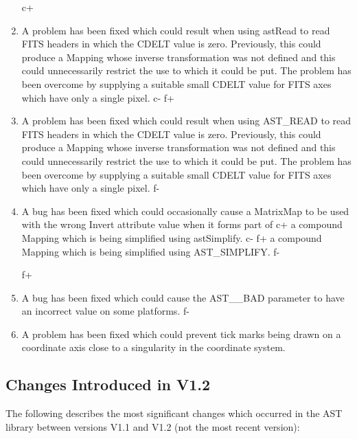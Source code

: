 \documentclass[twoside,11pt]{article}
\begin{document}
\begin{enumerate}
c+
\item A problem has been fixed which could result when using astRead
to read FITS headers in which the CDELT value is zero. Previously,
this could produce a Mapping whose inverse transformation was not
defined and this could unnecessarily restrict the use to which it
could be put. The problem has been overcome by supplying a suitable
small CDELT value for FITS axes which have only a single pixel.
c-
f+
\item A problem has been fixed which could result when using AST\_READ
to read FITS headers in which the CDELT value is zero. Previously,
this could produce a Mapping whose inverse transformation was not
defined and this could unnecessarily restrict the use to which it
could be put. The problem has been overcome by supplying a suitable
small CDELT value for FITS axes which have only a single pixel.
f-

\item A bug has been fixed which could occasionally cause a MatrixMap
to be used with the wrong Invert attribute value when it forms part of
c+
a compound Mapping which is being simplified using astSimplify.
c-
f+
a compound Mapping which is being simplified using AST\_SIMPLIFY.
f-

f+
\item A bug has been fixed which could cause the AST\_\_BAD parameter
to have an incorrect value on some platforms.
f-

\item A problem has been fixed which could prevent tick marks being
drawn on a coordinate axis close to a singularity in the coordinate
system.
\end{enumerate}

\subsection{Changes Introduced in V1.2}

The following describes the most significant changes which occurred in
the AST library between versions V1.1 and V1.2 (not the most recent
version):
\end{document}
